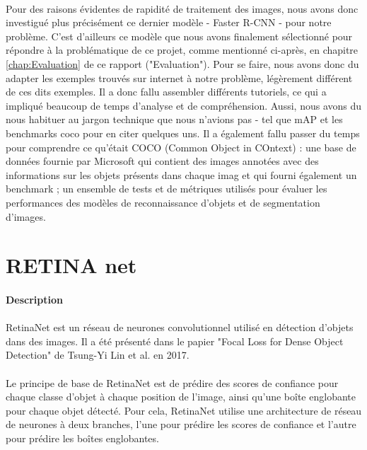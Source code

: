 \paragraph{} Pour des raisons évidentes de rapidité de traitement des images, nous avons donc investigué plus précisément ce dernier modèle - Faster R-CNN - pour notre problème. C'est d'ailleurs ce modèle que nous avons finalement sélectionné pour répondre à la problématique de ce projet, comme mentionné ci-après, en chapitre \autoref{chap:Evaluation} de ce rapport ("Evaluation").\newline
Pour se faire, nous avons donc du adapter les exemples trouvés sur internet à notre problème, légèrement différent de ces dits exemples. Il a donc fallu assembler différents tutoriels, ce qui a impliqué beaucoup de temps d'analyse et de compréhension. Aussi, nous avons du nous habituer au jargon technique que nous n'avions pas - tel que mAP et les benchmarks coco pour en citer quelques uns. Il a également fallu passer du temps pour comprendre ce qu'était COCO (Common Object in COntext) : une base de données fournie par Microsoft qui contient des images annotées avec des informations sur les objets présents dans chaque imag et qui fourni également un benchmark ; un ensemble de tests et de métriques utilisés pour évaluer les performances des modèles de reconnaissance d'objets et de segmentation d'images.


\section{RETINA net}

\paragraph{Description}

\paragraph{} RetinaNet est un réseau de neurones convolutionnel utilisé en détection d'objets dans des images. Il a été présenté dans le papier "Focal Loss for Dense Object Detection" de Tsung-Yi Lin et al. en 2017.

\paragraph{} Le principe de base de RetinaNet est de prédire des scores de confiance pour chaque classe d'objet à chaque position de l'image, ainsi qu'une boîte englobante pour chaque objet détecté. Pour cela, RetinaNet utilise une architecture de réseau de neurones à deux branches, l'une pour prédire les scores de confiance et l'autre pour prédire les boîtes englobantes.

